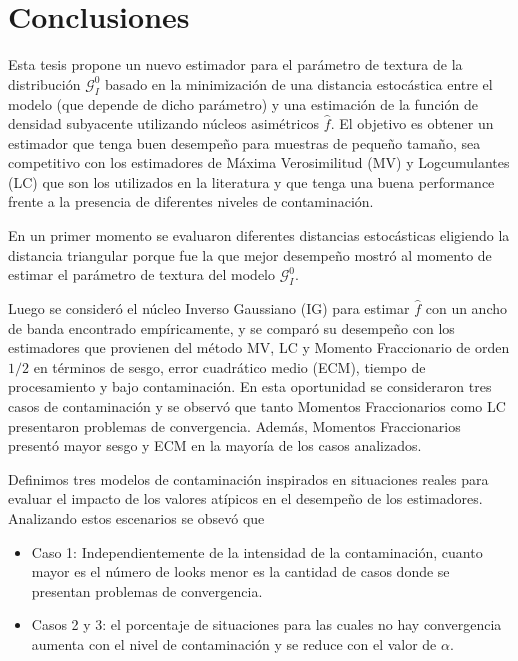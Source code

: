 
\newpage
$\ $
\thispagestyle{empty} %


\chapter{Conclusiones}
\label{Conclusiones}

Esta tesis propone un nuevo estimador para el parámetro de textura de la distribución $\mathcal{G}_I^0$ basado en la minimización de una distancia estocástica entre el modelo (que depende de dicho parámetro) y una estimación de la función de densidad subyacente utilizando núcleos asimétricos $\widehat{f}$. El objetivo es obtener un estimador que tenga buen desempeño para muestras de pequeño tamaño, sea competitivo con los estimadores de Máxima Verosimilitud (MV) y Logcumulantes (LC) que son los utilizados en la literatura y que tenga una buena performance frente a la presencia de diferentes niveles de contaminación.


En un primer momento se evaluaron diferentes distancias estocásticas eligiendo la distancia triangular porque fue la que mejor desempeño mostró al momento de estimar el parámetro de textura del modelo $\mathcal{G}_I^0$.

Luego se consideró el núcleo Inverso Gaussiano (IG) para estimar $\widehat{f}$ con un ancho de banda encontrado empíricamente, y se comparó su desempeño con los estimadores que provienen del método MV, LC y Momento Fraccionario de orden $1/2$ en términos de sesgo, error cuadrático medio (ECM), tiempo de procesamiento y bajo contaminación. En esta oportunidad se consideraron tres casos de contaminación y se observó que tanto Momentos Fraccionarios como LC presentaron problemas de convergencia. Además, Momentos Fraccionarios presentó mayor sesgo y ECM en la mayoría de los casos analizados.

Definimos tres modelos de contaminación inspirados en situaciones reales para evaluar el impacto de los valores atípicos en el desempeño de los estimadores. Analizando estos escenarios se obsevó que

\begin{itemize}
	\item Caso 1: Independientemente de la intensidad de la contaminación, cuanto mayor es el número de looks menor es la cantidad de casos donde se presentan problemas de convergencia. 
	\item  Casos 2 y 3: el porcentaje de situaciones para las cuales no hay convergencia aumenta con el nivel de contaminación y se reduce con el valor de $\alpha$.
\end{itemize}

